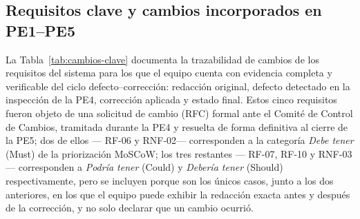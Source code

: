 \documentclass[journal,onecolumn]{IEEEtran}
\begin{document}
	\subsection{Requisitos clave y cambios incorporados en PE1--PE5}
	\label{sec:cambios-pe1-pe5}
	
	La Tabla~\ref{tab:cambios-clave} documenta la trazabilidad de cambios de los
	requisitos del sistema para los que el equipo cuenta con evidencia completa y
	verificable del ciclo defecto--corrección: redacción original, defecto
	detectado en la inspección de la PE4, corrección aplicada y estado final.
	Estos cinco requisitos fueron objeto de una solicitud de cambio (RFC) formal
	ante el Comité de Control de Cambios, tramitada durante la PE4 y resuelta de
	forma definitiva al cierre de la PE5; dos de ellos --- RF-06 y RNF-02---
	corresponden a la categoría \emph{Debe tener} (Must) de la priorización
	MoSCoW; los tres restantes --- RF-07, RF-10 y RNF-03--- corresponden a
	\emph{Podría tener} (Could) y \emph{Debería tener} (Should)
	respectivamente, pero se incluyen porque son los únicos casos, junto a los
	dos anteriores, en los que el equipo puede exhibir la redacción exacta antes
	y después de la corrección, y no solo declarar que un cambio ocurrió.
	
\end{document}
